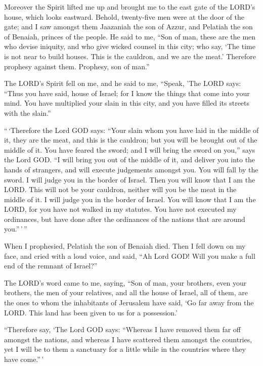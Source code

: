  Moreover the Spirit lifted me up and brought me to the east
gate of the LORD's house, which looks eastward. Behold, twenty-five men
were at the door of the gate; and I saw amongst them Jaazaniah the son
of Azzur, and Pelatiah the son of Benaiah, princes of the people.
 He said to me, ``Son of man, these are the men who devise
iniquity, and who give wicked counsel in this city;  who
say, `The time is not near to build houses. This is the cauldron, and we
are the meat.'  Therefore prophesy against them. Prophesy,
son of man.''

 The LORD's Spirit fell on me, and he said to me, ``Speak,
'The LORD says: ``Thus you have said, house of Israel; for I know the
things that come into your mind.  You have multiplied your
slain in this city, and you have filled its streets with the slain.''

 ``\,`Therefore the Lord GOD says: ``Your slain whom you
have laid in the middle of it, they are the meat, and this is the
cauldron; but you will be brought out of the middle of it. 
You have feared the sword; and I will bring the sword on you,'' says the
Lord GOD.  ``I will bring you out of the middle of it, and
deliver you into the hands of strangers, and will execute judgements
amongst you.  You will fall by the sword. I will judge you
in the border of Israel. Then you will know that I am the LORD.
 This will not be your cauldron, neither will you be the
meat in the middle of it. I will judge you in the border of Israel.
 You will know that I am the LORD, for you have not walked
in my statutes. You have not executed my ordinances, but have done after
the ordinances of the nations that are around you.''\,'\,''

 When I prophesied, Pelatiah the son of Benaiah died. Then
I fell down on my face, and cried with a loud voice, and said, ``Ah Lord
GOD! Will you make a full end of the remnant of Israel?''

 The LORD's word came to me, saying,  ``Son of
man, your brothers, even your brothers, the men of your relatives, and
all the house of Israel, all of them, are the ones to whom the
inhabitants of Jerusalem have said, `Go far away from the LORD. This
land has been given to us for a possession.'

 ``Therefore say, `The Lord GOD says: ``Whereas I have
removed them far off amongst the nations, and whereas I have scattered
them amongst the countries, yet I will be to them a sanctuary for a
little while in the countries where they have come.''\,'

